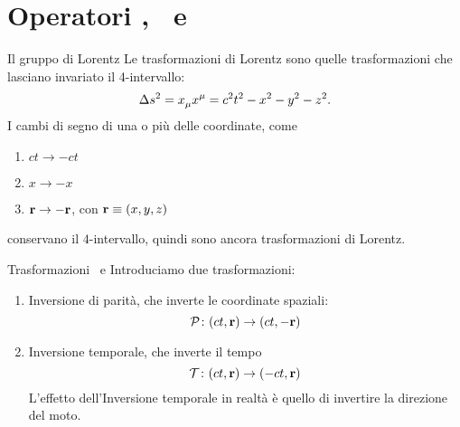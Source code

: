 \section{Operatori \hP, \hT\ e \hPT}
\begin{frame}{Il gruppo di Lorentz}
    Le trasformazioni di Lorentz sono quelle trasformazioni che lasciano invariato il 4-intervallo:
    \begin{equation*}
        \Delta s^2 = \tensor{x}{_\mu}\tensor{x}{^\mu} = c^2t^2 - x^2 - y^2 - z^2
        \myperiod
    \end{equation*}
    \pause
    I cambi di segno di una o più delle coordinate, come
    \begin{enumerate}[label=\mybullet]
        \item $ct \to -ct$
        \item $x \to -x$
        \item $\vb{r} \to -\vb{r}$, con $\vb{r} \equiv \pqty{x,y,z}$
    \end{enumerate}
    conservano il $4$-intervallo, quindi sono ancora trasformazioni di Lorentz.
\end{frame}

\begin{frame}{Trasformazioni \mcP\ e \mcT}
    Introduciamo due trasformazioni:
    \begin{enumerate}[label=\mybullet]
        \pause
        \item Inversione di parità, che inverte le coordinate spaziali:
            \begin{equation*}
                \func{\mcP}{\pqty{ct,\vb{r}}}{\pqty{ct,-\vb{r}}}
            \end{equation*}
        \pause
        \item Inversione temporale, che inverte il tempo
            \begin{equation*}
                \func{\mcT}{\pqty{ct,\vb{r}}}{\pqty{-ct,\vb{r}}}
            \end{equation*}
            \pause L'effetto dell'Inversione temporale in realtà è quello di invertire la direzione del moto.
    \end{enumerate}
\end{frame}

